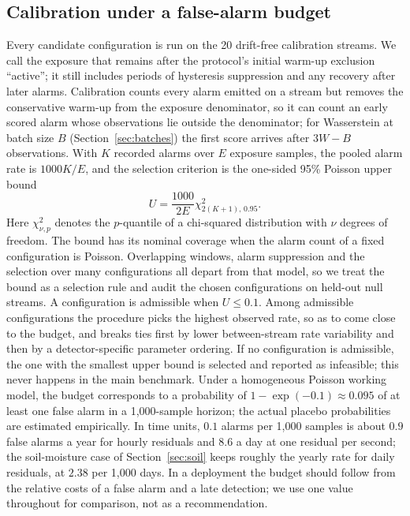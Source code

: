 \documentclass[preprint,12pt]{elsarticle}
\begin{document}
\subsection{Calibration under a false-alarm budget}
\label{sec:calibration}
Every candidate configuration is run on the 20 drift-free calibration streams. We call the exposure that remains after the protocol's initial warm-up exclusion ``active''; it still includes periods of hysteresis suppression and any recovery after later alarms. Calibration counts every alarm emitted on a stream but removes the conservative warm-up from the exposure denominator, so it can count an early scored alarm whose observations lie outside the denominator; for Wasserstein at batch size $B$ (Section~\ref{sec:batches}) the first score arrives after $3W-B$ observations. With $K$ recorded alarms over $E$ exposure samples, the pooled alarm rate is $1000K/E$, and the selection criterion is the one-sided 95\% Poisson upper bound
\begin{equation}\label{eq:ucb}
U=\frac{1000}{2E}\chi^2_{2(K+1),\,0.95}.
\end{equation}
Here $\chi^2_{\nu,p}$ denotes the $p$-quantile of a chi-squared distribution with $\nu$ degrees of freedom. The bound has its nominal coverage when the alarm count of a fixed configuration is Poisson. Overlapping windows, alarm suppression and the selection over many configurations all depart from that model, so we treat the bound as a selection rule and audit the chosen configurations on held-out null streams. A configuration is admissible when $U\leq0.1$. Among admissible configurations the procedure picks the highest observed rate, so as to come close to the budget, and breaks ties first by lower between-stream rate variability and then by a detector-specific parameter ordering. If no configuration is admissible, the one with the smallest upper bound is selected and reported as infeasible; this never happens in the main benchmark. Under a homogeneous Poisson working model, the budget corresponds to a probability of $1-\exp(-0.1)\approx0.095$ of at least one false alarm in a 1,000-sample horizon; the actual placebo probabilities are estimated empirically. In time units, $0.1$ alarms per 1,000 samples is about $0.9$ false alarms a year for hourly residuals and $8.6$ a day at one residual per second; the soil-moisture case of Section~\ref{sec:soil} keeps roughly the yearly rate for daily residuals, at $2.38$ per 1,000 days. In a deployment the budget should follow from the relative costs of a false alarm and a late detection; we use one value throughout for comparison, not as a recommendation.
\end{document}

